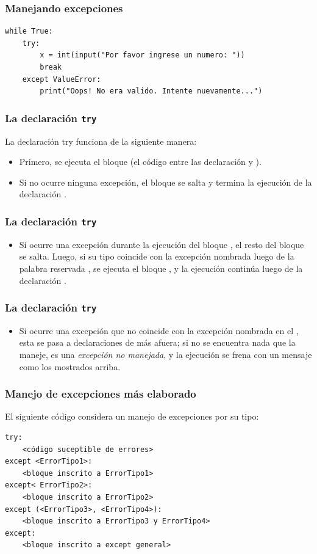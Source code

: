 \documentclass[12pt]{beamer}
\begin{document}
\begin{frame}[fragile]
\frametitle{Manejando excepciones}
\begin{lstlisting}
while True:
    try:
        x = int(input("Por favor ingrese un numero: "))
        break
    except ValueError:
        print("Oops! No era valido. Intente nuevamente...")
\end{lstlisting}
\end{frame}
\begin{frame}
\frametitle{La declaración \texttt{try}}
La declaración try funciona de la siguiente manera:
\begin{itemize}[<+->]
\item Primero, se ejecuta el bloque  (el código entre las declaración  y ).
\item  Si no ocurre ninguna excepción, el bloque  se salta y termina la ejecución de la declaración .
\end{itemize}
\end{frame}
\begin{frame}
\frametitle{La declaración \texttt{try}}
\begin{itemize}[<+->]
\item  Si ocurre una excepción durante la ejecución del bloque , el resto del bloque se salta. Luego, si su tipo coincide con la excepción nombrada luego de la palabra reservada , se ejecuta el bloque , y la ejecución continúa luego de la declaración .
\end{itemize}
\end{frame}
\begin{frame}
\frametitle{La declaración \texttt{try}}
\begin{itemize}[<+->]
\item Si ocurre una excepción que no coincide con la excepción nombrada en el , esta se pasa a declaraciones  de más afuera; si no se encuentra nada que la maneje, es una \emph{excepción no manejada}, y la ejecución se frena con un mensaje como los mostrados arriba.
\end{itemize}
\end{frame}
\begin{frame}[fragile]
\frametitle{Manejo de excepciones más elaborado}
El siguiente código considera un manejo de excepciones por su tipo:
\fontsize{12}{11}\selectfont
\begin{verbatim}
try:
    <código suceptible de errores>
except <ErrorTipo1>:
    <bloque inscrito a ErrorTipo1>
except< ErrorTipo2>:
    <bloque inscrito a ErrorTipo2>
except (<ErrorTipo3>, <ErrorTipo4>):
    <bloque inscrito a ErrorTipo3 y ErrorTipo4>
except:
    <bloque inscrito a except general>
\end{verbatim}
\end{frame}
\end{document}
